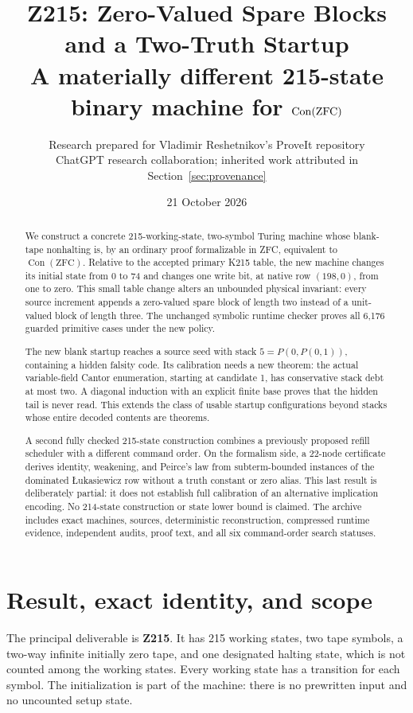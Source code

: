 \documentclass[11pt,letterpaper]{article}
\title{\textbf{Z215: Zero-Valued Spare Blocks\protect\\and a Two-Truth Startup}\\[0.6em]
\large A materially different 215-state binary machine for $\Con(\ZFC)$}
\author{Research prepared for Vladimir Reshetnikov's ProveIt repository\\
\small ChatGPT research collaboration; inherited work attributed in Section~\ref{sec:provenance}}
\date{21 October 2026}
\theoremstyle{definition}
\newcommand{\ZFC}{\mathrm{ZFC}}
\newcommand{\Con}{\operatorname{Con}}
\begin{document}
\maketitle
\begin{abstract}
We construct a concrete 215-working-state, two-symbol Turing machine
whose blank-tape nonhalting is, by an ordinary proof formalizable in ZFC,
equivalent to $\Con(\ZFC)$.  Relative to the accepted primary K215 table,
the new machine changes its initial state from 0 to 74 and changes one
write bit, at native row $(198,0)$, from one to zero.  This small table
change alters an unbounded physical invariant: every source increment
appends a zero-valued spare block of length two instead of a unit-valued
block of length three.  The unchanged symbolic runtime checker proves
all 6,176 guarded primitive cases under the new policy.

The new blank startup reaches a source seed with stack
$5=P(0,P(0,1))$, containing a hidden falsity code.  Its calibration needs
a new theorem: the actual variable-field Cantor enumeration, starting
at candidate 1, has conservative stack debt at most two.  A diagonal
induction with an explicit finite base proves that the hidden tail is
never read.  This extends the class of usable startup configurations
beyond stacks whose entire decoded contents are theorems.

A second fully checked 215-state construction combines a previously
proposed refill scheduler with a different command order.  On the
formalism side, a 22-node certificate derives identity, weakening, and
Peirce's law from subterm-bounded instances of the dominated
Łukasiewicz row without a truth constant or zero alias.  This last
result is deliberately partial: it does not establish full calibration
of an alternative implication encoding.  No 214-state construction or
state lower bound is claimed.  The archive includes exact machines,
sources, deterministic reconstruction, compressed runtime evidence,
independent audits, proof text, and all six command-order search statuses.
\end{abstract}
\clearpage
\tableofcontents
\clearpage

\section{Result, exact identity, and scope}
\label{sec:result}

The principal deliverable is \textbf{Z215}.  It has 215 working states,
two tape symbols, a two-way infinite initially zero tape, and one
designated halting state, which is not counted among the working
states.  Every working state has a transition for each symbol.  The
initialization is part of the machine: there is no prewritten input and
no uncounted setup state.
\end{document}

